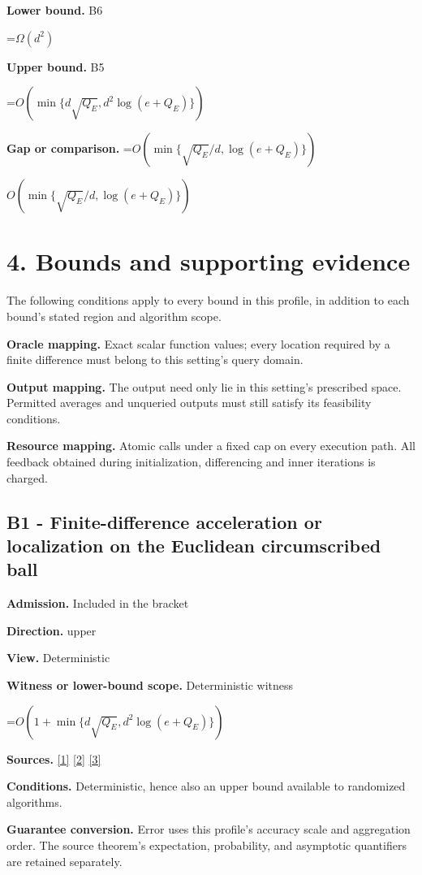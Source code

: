 \documentclass[10pt,a4paper]{article}
\newcommand{\AtlasMath}[1]{\par\begingroup\centering\setbox0=\hbox{$\displaystyle #1$}\ifdim\wd0>1.4\linewidth\typeout{ATLAS WIDE FORMULA: \the\wd0}\fi\ifdim\wd0>\linewidth\resizebox{\linewidth}{!}{\box0}\else\box0\fi\par\endgroup}
\newcommand{\AtlasInlineMath}[1]{\begingroup\setbox0=\hbox{$#1$}\ifdim\wd0>.4\linewidth\endgroup\AtlasMath{#1}\else\endgroup$#1$\fi}
\begin{document}
\textbf{Lower bound.} B6

\AtlasMath{\Omega(d^2)}
\textbf{Upper bound.} B5

\AtlasMath{O(\min\{d\sqrt{Q_E},d^2\log(e+Q_E)\})}
\textbf{Gap or comparison.} \AtlasInlineMath{O(\min\{\sqrt{Q_E}/d,\log(e+Q_E)\})}

\section{4. Bounds and supporting evidence}
The following conditions apply to every bound in this profile, in addition to each bound's stated region and algorithm scope.

\textbf{Oracle mapping.} Exact scalar function values; every location required by a finite difference must belong to this setting's query domain.

\textbf{Output mapping.} The output need only lie in this setting's prescribed space. Permitted averages and unqueried outputs must still satisfy its feasibility conditions.

\textbf{Resource mapping.} Atomic calls under a fixed cap on every execution path. All feedback obtained during initialization, differencing and inner iterations is charged.

\subsection{B1 - Finite-difference acceleration or localization on the Euclidean circumscribed ball}
\textbf{Admission.} Included in the bracket

\textbf{Direction.} upper

\textbf{View.} Deterministic

\textbf{Witness or lower-bound scope.} Deterministic witness

\AtlasMath{O(1+\min\{d\sqrt{Q_E},d^2\log(e+Q_E)\})}
\textbf{Sources.} \href{https://arxiv.org/html/2610.00345v1}{[1]} \href{https://arxiv.org/html/2607.16558v2}{[2]} \href{https://www.mathnet.ru/php/archive.phtml?jrnid=mzm&option_lang=eng&paperid=1697&wshow=paper}{[3]}

\textbf{Conditions.} Deterministic, hence also an upper bound available to randomized algorithms.

\textbf{Guarantee conversion.} Error uses this profile's accuracy scale and aggregation order. The source theorem's expectation, probability, and asymptotic quantifiers are retained separately.
\end{document}
